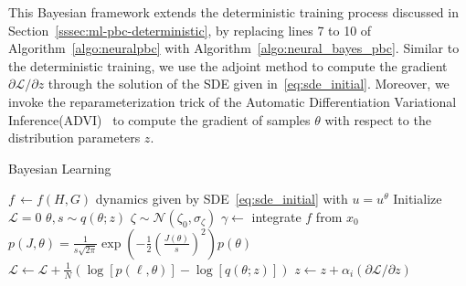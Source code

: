 %
This Bayesian framework extends the deterministic training process discussed in
Section~\ref{sssec:ml-pbc-deterministic}, by replacing lines 7 to 10 of
Algorithm~\ref{algo:neuralpbc} with Algorithm~\ref{algo:neural_bayes_pbc}.
%
%
%
Similar to the deterministic training, we use the adjoint method to compute the
gradient ${\partial \mathcal{L}}/{\partial z}$ through the solution of the SDE
given in~\eqref{eq:sde_initial}.
%
Moreover, we invoke the reparameterization trick of the Automatic
Differentiation Variational
Inference(\textsc{ADVI})~\cite{kucukelbir2015automatic} to compute the gradient
of samples $\theta$ with respect to the distribution parameters $z$.
%



\begin{algorithm}
    \caption{Bayesian Learning}\label{algo:neural_bayes_pbc}
    \small
    \begin{algorithmic}[1]
        \State $f \,\gets f(H,G)$ dynamics given by SDE~\eqref{eq:sde_initial} with $u = u^\theta$
        \State Initialize $\mathcal{L} = 0$
            \State $\theta, s \sim q(\theta; z)$ 
            \State $\zeta \sim \mathcal{N}(\zeta_0,\sigma_{\zeta})$ 
            \State $\gamma \gets$ integrate $f$ from $x_0$ 
            \State $p(J, \theta) = \frac{1}{s\sqrt{2\pi}}\exp{\left(-\frac{1}{2} \left ( \frac{J(\theta)}{s}\right)^2 \right)} p(\theta)$
            \State $\mathcal{L} \gets \mathcal{L} + \frac{1}{N}\left (\log[p(\ell, \theta)] - \log[q(\theta;z)]\right)$
        \EndFor
        \EndFor
        \State $z \gets z + \alpha_i \left({\partial \mathcal{L}}/{\partial z}\right)$
    \end{algorithmic}
\end{algorithm}

